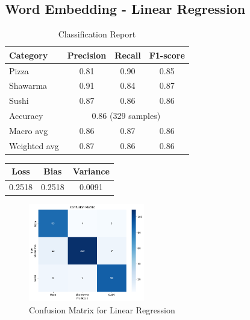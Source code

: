 \subsection{Word Embedding - Linear Regression}
\begin{table}[h]
    \centering
    \begin{tabular}{lccc}
        \hline
        Category     & Precision                              & Recall & F1-score \\
        \hline
        Pizza        & 0.81                                   & 0.90   & 0.85     \\
        Shawarma     & 0.91                                   & 0.84   & 0.87     \\
        Sushi        & 0.87                                   & 0.86   & 0.86     \\
        \hline
        Accuracy     & \multicolumn{3}{c}{0.86 (329 samples)}                     \\
        Macro avg    & 0.86                                   & 0.87   & 0.86     \\
        Weighted avg & 0.87                                   & 0.86   & 0.86     \\
        \hline
    \end{tabular}
    \caption{Classification Report}
\end{table}

\begin{table}[h]
    \centering
    \begin{tabular}{ccc}
        \hline
        Loss   & Bias   & Variance \\
        \hline
        0.2518 & 0.2518 & 0.0091   \\
        \hline
    \end{tabular}
\end{table}

\begin{figure}[h]
    \centering
    \includegraphics[width=0.45\textwidth]{params/linearregression_confusion.png}
    \caption{Confusion Matrix for Linear Regression}
\end{figure}